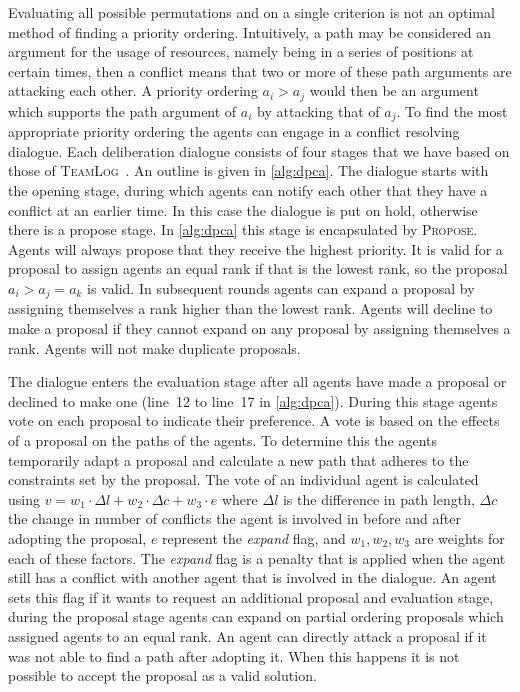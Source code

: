Evaluating all possible permutations and on a single
criterion is not an optimal method of finding a priority ordering. Intuitively, 
a path may be 
considered an argument for the usage of resources, namely being in a series of 
positions at certain times, then a conflict means that two or more of these path 
arguments are attacking each other. A 
priority ordering $a_i > a_j$ would then be an argument which supports the path 
argument 
of $a_i$ by attacking that of $a_j$. To find the most appropriate priority 
ordering the agents can engage in a conflict resolving dialogue. 
Each deliberation 
dialogue consists of four stages that we have based on those of 
\textsc{TeamLog}~\cite{dunin-keplicz2011}. An outline is given in \autoref{alg:dpca}. The dialogue 
starts with the opening stage, during which agents can notify each other that 
they have a conflict at an earlier time. In this case the dialogue is put on 
hold, otherwise there is a propose stage. In \autoref{alg:dpca} 
this stage is encapsulated by \textsc{Propose}. Agents will always propose that 
they receive the highest priority. It is valid for a proposal to assign agents 
an equal rank if that is the lowest rank, so the proposal $a_i > a_j = a_k$ is 
valid. In subsequent rounds agents can expand a proposal by assigning 
themselves a rank higher than the lowest rank. Agents will decline to make a 
proposal if they cannot expand on any proposal by assigning themselves a rank. 
Agents will not make duplicate proposals.

The dialogue enters the evaluation stage after all agents have made a 
proposal or declined to make one (line~12 to line~17 in 
\autoref{alg:dpca}).
During this stage agents vote on each proposal to indicate their preference.
A vote is based on the effects of a 
proposal on the paths of the agents. To determine this the agents 
temporarily adapt a proposal and calculate a new path that adheres to the 
constraints set by the proposal.
The vote of an individual agent is calculated using
$ v = w_1 \cdot \Delta l + w_2 \cdot \Delta c + w_3 \cdot e $
where $\Delta l$ is the difference in path length, $\Delta c$ the change in 
number of conflicts the agent is involved in before and after adopting the 
proposal, $e$ represent the \emph{expand} 
flag, and $w_1, w_2, w_3$ are weights for each of these factors. The 
\emph{expand} flag is a penalty that is applied when the agent still has a 
conflict with another agent that is involved in 
the dialogue. An agent sets this flag if it wants to request an additional 
proposal and evaluation stage, during the proposal stage agents can expand on 
partial ordering proposals which assigned agents to an equal rank. An agent can 
directly attack a proposal if it was not able to find a path after adopting it. 
When this happens it is not possible to accept the proposal as a valid solution.

